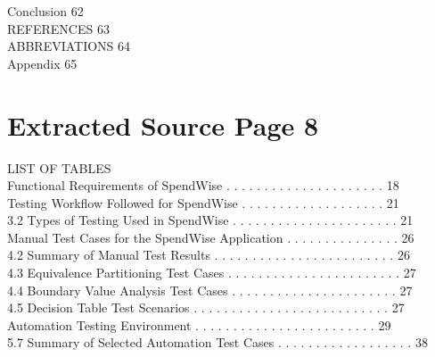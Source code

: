 \documentclass[12pt,a4paper]{report}
\begin{document}
 Conclusion                                                                                   62\\ 

\smallskip
REFERENCES                                                                                     63\\ 

\smallskip
ABBREVIATIONS                                                                                  64\\ 

\smallskip
Appendix                                                                                       65\\ 

\clearpage
\section*{Extracted Source Page 8}
LIST OF TABLES\\ 

   Functional Requirements of SpendWise . . . . . . . . . . . . . . . . . . . . .       18\\ 

   Testing Workflow Followed for SpendWise . . . . . . . . . . . . . . . . . . .        21\\ 
3.2   Types of Testing Used in SpendWise . . . . . . . . . . . . . . . . . . . . . .       21\\ 

   Manual Test Cases for the SpendWise Application . . . . . . . . . . . . . . .        26\\ 
4.2   Summary of Manual Test Results . . . . . . . . . . . . . . . . . . . . . . . .       26\\ 
4.3   Equivalence Partitioning Test Cases . . . . . . . . . . . . . . . . . . . . . . .    27\\ 
4.4   Boundary Value Analysis Test Cases . . . . . . . . . . . . . . . . . . . . . .       27\\ 
4.5   Decision Table Test Scenarios . . . . . . . . . . . . . . . . . . . . . . . . . .    27\\ 

   Automation Testing Environment . . . . . . . . . . . . . . . . . . . . . . . .       29\\ 
5.7   Summary of Selected Automation Test Cases . . . . . . . . . . . . . . . . . .        38\\ 
\end{document}
